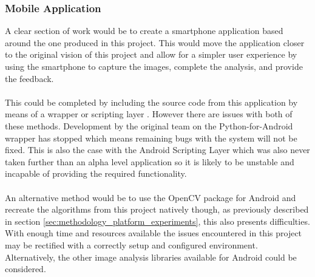 		\subsubsection{Mobile Application}
			A clear section of work would be to create a smartphone application based around the one produced in this project. This would move the application closer to the original vision of this project and allow for a simpler user experience by using the smartphone to capture the images, complete the analysis, and provide the feedback.
			\\\\
			This could be completed by including the source code from this application by means of a wrapper \citep{kivy2015python} or scripting layer \citep{asl}. However there are issues with both of these methods. Development by the original team on the Python-for-Android wrapper has stopped which means remaining bugs with the system will not be fixed. This is also the case with the Android Scripting Layer which was also never taken further than an alpha level application so it is likely to be unstable and incapable of providing the required functionality.
			\\\\
			An alternative method would be to use the OpenCV package for Android and recreate the algorithms from this project natively though, as previously described in section \ref{sec:methodology_platform_experiments}, this also presents difficulties. With enough time and resources available the issues encountered in this project may be rectified with a correctly setup and configured environment. Alternatively, the other image analysis libraries available for Android could be considered.
